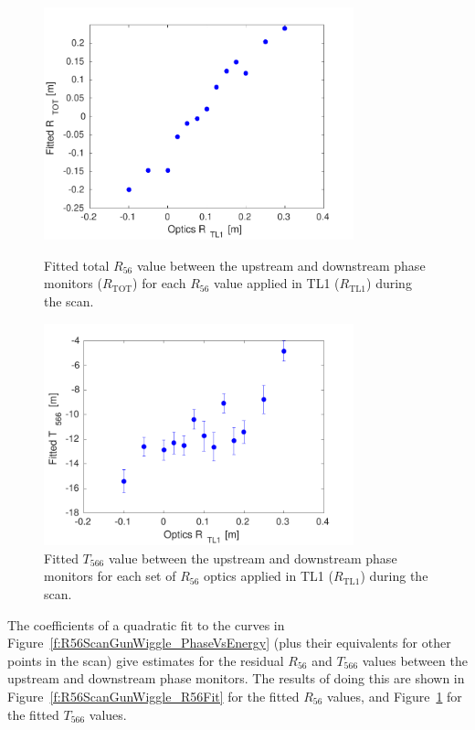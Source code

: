 \begin{figure}
  \centering
  \includegraphics[width=0.8\textwidth]{Figures/propagation/R56ScanGunWiggle_R56Fit}
  \caption{Fitted total \(R_{56}\) value between the upstream and downstream phase monitors (\(R_{\mathrm{TOT}}\)) for each \(R_{56}\) value applied in TL1 (\(R_{\mathrm{TL1}}\)) during the scan.}
  \label{f:R56ScanGunWiggle_R56Fit}
  \includegraphics[width=0.8\textwidth]{Figures/propagation/R56ScanGunWiggle_T566Fit}
  \caption{Fitted \(T_{566}\) value between the upstream and downstream phase monitors for each set of \(R_{56}\) optics applied in TL1 (\(R_{\mathrm{TL1}}\)) during the scan.}
  \label{f:R56ScanGunWiggle_T566Fit}
\end{figure}

The coefficients of a quadratic fit to the curves in Figure~\ref{f:R56ScanGunWiggle_PhaseVsEnergy} (plus their equivalents for other points in the scan) give estimates for the residual \(R_{56}\) and \(T_{566}\) values between the upstream and downstream phase monitors. The results of doing this are shown in Figure~\ref{f:R56ScanGunWiggle_R56Fit} for the fitted \(R_{56}\) values, and Figure~\ref{f:R56ScanGunWiggle_T566Fit} for the fitted \(T_{566}\) values. 

